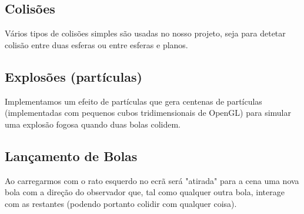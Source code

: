 \documentclass[12pt]{article}
\begin{document}
\subsection*{Colisões}
Vários tipos de colisões simples são usadas no nosso projeto, seja para detetar colisão entre duas esferas ou entre esferas e planos.

\subsection*{Explosões (partículas)}
Implementamos um efeito de partículas que gera centenas de partículas (implementadas com pequenos cubos tridimensionais de OpenGL) para simular uma explosão fogosa quando duas bolas colidem.

\subsection*{Lançamento de Bolas}
Ao carregarmos com o rato esquerdo no ecrã será "atirada" para a cena uma nova bola com a direção
do observador que, tal como qualquer outra bola, interage com as restantes (podendo portanto colidir com qualquer coisa).
\end{document}
